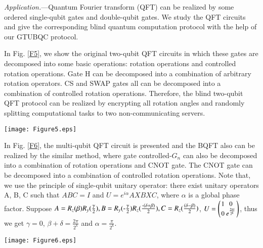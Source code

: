 \documentclass[aps,pra,showpacs,twocolumn,superscriptaddress]{revtex4-1}
\begin{document}
\emph{Application.}---Quantum Fourier transform (QFT) can be realized by some ordered single-qubit gates and double-qubit gates. We study the QFT circuits and give the corresponding blind quantum computation protocol with the help of our GTUBQC protocol.

In Fig. \ref{F5}, we show the original two-qubit QFT circuits in which these gates are decomposed into some basic operations: rotation operations and controlled rotation operations. Gate H can be decomposed into a combination of arbitrary rotation operators. CS and SWAP gates all can be decomposed into a combination of controlled rotation operations. Therefore, the blind two-qubit QFT protocol can be realized by encrypting all rotation angles and randomly splitting computational tasks to two non-communicating servers.
\begin{figure*}[!htp]
  \centering
  \texttt{[image: Figure5.eps]}
  \caption{\textbf{(a)} The quantum circuit for two-qubit quantum Fourier transform. \textbf{(b)} The decomposition of gate controlled-S. \textbf{(c)} The decomposition of gate SWAP. \textbf{(d)} The decomposition of gate H.}\label{F5}
\end{figure*}

In Fig. \ref{F6}, the multi-qubit QFT circuit is presented and the BQFT also can be realized by the similar method, where gate controlled-$G_n$ can also be decomposed into a combination of rotation operations and CNOT gate. The CNOT gate can be decomposed into a combination of controlled rotation operations. Note that, we use the principle of single-qubit unitary operator: there exist unitary operators A, B, C such that $ABC=I$ and $U=e^{i\alpha}AXBXC$, where $\alpha$ is a global phase factor. Suppose $A=R_z(\beta)R_y(\frac{\gamma}{2}), B=R_y(\textnormal{-}\frac{\gamma}{2})R_z(\frac{\textnormal{-}(\delta+\beta)}{2}), C=R_z(\frac{(\delta-\beta)}{2})$,
$\small
\setlength{\arraycolsep}{1.2pt}
U=\left(
  \begin{array}{cc}
  1   &  0 \\
  0   &  e^{\frac{2\pi i}{2^k}}\\
  \end{array}
\right)$, thus we get $\gamma=0$, $\beta+\delta=\frac{2\pi}{2^k}$ and $\alpha=\frac{\pi}{2^k}$.

\begin{figure*}[!htp]
  \centering
  \texttt{[image: Figure6.eps]}
  \caption{\textbf{(a)} The quantum circuit for multi-qubit quantum Fourier transform. \textbf{(b)} The decomposition of gate $G_n$.}\label{F6}
\end{figure*}
\end{document}
